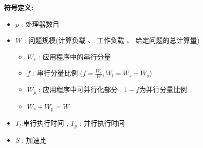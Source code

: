 \documentclass[UTF8,a4paper]{ctexart}
\begin{document}
  \textbf{符号定义:}
  \begin{itemize}
    \item $p$ : 处理器数目
    \item $W$ : 问题规模(计算负载 、 工作负载 、 给定问题的总计算量)
    \begin{itemize}
      \item $W_s$ : 应用程序中的串行分量
      \item $f$ : 串行分量比例 ($f = \frac{W_s}{W} , W_l = W_s + W_o$)
      \item $W_p$ : 应用程序中可并行化部分 , $1-f$为并行分量比例
      \item $W_s + W_p = W$
    \end{itemize}
    \item $T_l$:串行执行时间 , $T_p$ : 并行执行时间
    \item $S$ : 加速比
  \end{itemize}
\end{document}
